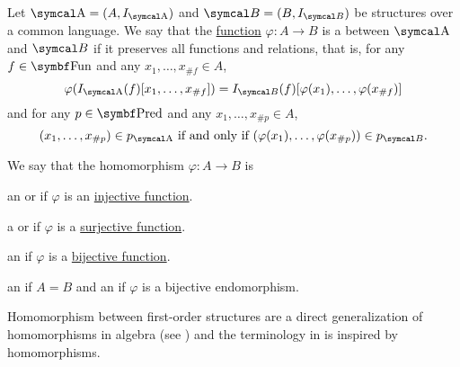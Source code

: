 \begin{definition}\label{def:first_order_homomorphism}
  Let \( \CA = (A, I_{\CA}) \) and \( \Cal{B} = (B, I_{\Cal{B}}) \) be structures over a common language. We say that the \hyperref[def:function]{function} \( \varphi: A \to B \) is a  between \( \CA \) and \( \Cal{B} \) if it preserves all functions and relations, that is, for any \( f \in \Bold{Fun} \) and any \( x_1, \ldots, x_{\#f} \in A \),
  \begin{equation*}
    \varphi(I_{\CA}(f)[x_1, \ldots, x_{\#f}]) = I_{\Cal{B}}(f)[\varphi(x_1), \ldots, \varphi(x_{\#f})]
  \end{equation*}
  and for any \( p \in \Bold{Pred} \) and any \( x_1, \ldots, x_{\#p} \in A \),
  \begin{equation*}
    (x_1, \ldots, x_{\#p}) \in p_{\CA} \text{ if and only if } (\varphi(x_1), \ldots, \varphi(x_{\#p})) \in p_{\Cal{B}}.
  \end{equation*}

  We say that the homomorphism \( \varphi: A \to B \) is
  \begin{DefEnum}
     an  or  if \( \varphi \) is an \hyperref[def:function_invertibility/injection]{injective function}.

     a  or  if \( \varphi \) is a \hyperref[def:function_invertibility/surjection]{surjective function}.

     an  if \( \varphi \) is a \hyperref[def:function_invertibility/bijection]{bijective function}.

     an  if \( A = B \) and an  if \( \varphi \) is a bijective endomorphism.
  \end{DefEnum}

  Homomorphism between first-order structures are a direct generalization of homomorphisms in algebra (see ) and the terminology in  is inspired by homomorphisms.
\end{definition}

